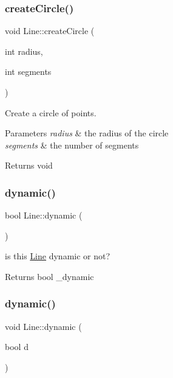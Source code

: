 \subsubsection{\texorpdfstring{create\+Circle()}{createCircle()}}
{\footnotesize\ttfamily void Line\+::create\+Circle (\begin{DoxyParamCaption}\item[{int}]{radius,  }\item[{int}]{segments }\end{DoxyParamCaption})}



Create a circle of points. 


\begin{DoxyParams}{Parameters}
{\em radius} & the radius of the circle \\
\hline
{\em segments} & the number of segments \\
\hline
\end{DoxyParams}
\begin{DoxyReturn}{Returns}
void 
\end{DoxyReturn}
\mbox{\label{class_line_a28de742fe9c280abeeb39a6aae53a463}} 
\subsubsection{\texorpdfstring{dynamic()}{dynamic()}\hspace{0.1cm}{\footnotesize\ttfamily [1/2]}}
{\footnotesize\ttfamily bool Line\+::dynamic (\begin{DoxyParamCaption}{ }\end{DoxyParamCaption})\hspace{0.3cm}{\ttfamily [inline]}}



is this \hyperlink{class_line}{Line} dynamic or not? 

\begin{DoxyReturn}{Returns}
bool \+\_\+dynamic 
\end{DoxyReturn}
\mbox{\label{class_line_ad1014861d0d8663f2c44e4602f4b5d16}} 
\subsubsection{\texorpdfstring{dynamic()}{dynamic()}\hspace{0.1cm}{\footnotesize\ttfamily [2/2]}}
{\footnotesize\ttfamily void Line\+::dynamic (\begin{DoxyParamCaption}\item[{bool}]{d }\end{DoxyParamCaption})\hspace{0.3cm}{\ttfamily [inline]}}



